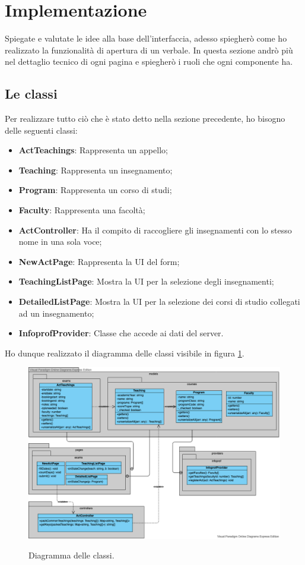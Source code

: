 \documentclass[Lau, oneside, noexaminfo]{sapthesis}%
\begin{document}
\newpage
\section{Implementazione}
\label{sec:dev}
Spiegate e valutate le idee alla base dell'interfaccia, adesso spiegherò come ho realizzato la funzionalità di apertura di un verbale. In questa sezione andrò più nel dettaglio tecnico di ogni pagina e spiegherò i ruoli che ogni componente ha.

\subsection{Le classi}
Per realizzare tutto ciò che è stato detto nella sezione precedente, ho bisogno delle seguenti classi:
\begin{itemize}
	\item \textbf{ActTeachings}: Rappresenta un appello;
	\item \textbf{Teaching}: Rappresenta un insegnamento;
	\item \textbf{Program}: Rappresenta un corso di studi;
	\item \textbf{Faculty}: Rappresenta una facoltà;
	\item \textbf{ActController}: Ha il compito di raccogliere gli insegnamenti con lo stesso nome in una sola voce;
	\item \textbf{NewActPage}: Rappresenta la UI del form;
	\item \textbf{TeachingListPage}: Mostra la UI per la selezione degli insegnamenti;
	\item \textbf{DetailedListPage}: Mostra la UI per la selezione dei corsi di studio collegati ad un insegnamento;
	\item \textbf{InfoprofProvider}: Classe che accede ai dati del server.
\end{itemize}

Ho dunque realizzato il diagramma delle classi visibile in figura \ref{fig:classDiagram}.
\begin{figure}[H]
	\caption{Diagramma delle classi.}
	\centering
	\includegraphics[width=1\textwidth]{diagrams/classDiagram}
	\label{fig:classDiagram}
\end{figure}
\end{document}
